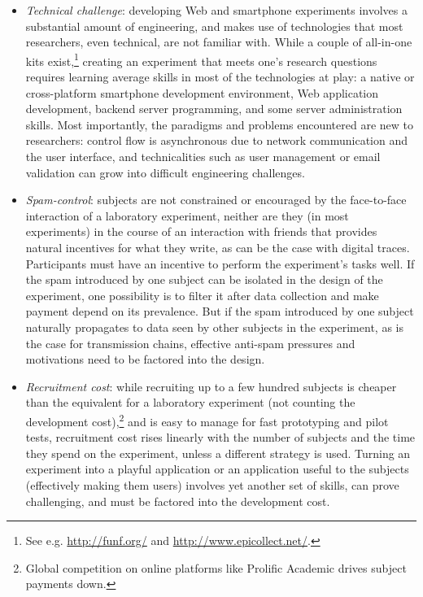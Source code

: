 \begin{itemize}
\item
  \emph{Technical challenge}: developing Web and smartphone experiments
  involves a substantial amount of engineering, and makes use of
  technologies that most researchers, even technical, are not familiar
  with. While a couple of all-in-one kits exist,\footnote{See e.g.
    \url{http://funf.org/} and \url{http://www.epicollect.net/}.}
  creating an experiment that meets one's research questions requires
  learning average skills in most of the technologies at play: a native
  or cross-platform smartphone development environment, Web application
  development, backend server programming, and some server
  administration skills. Most importantly, the paradigms and problems
  encountered are new to researchers: control flow is asynchronous due
  to network communication and the user interface, and technicalities
  such as user management or email validation can grow into difficult
  engineering challenges.
\item
  \emph{Spam-control}: subjects are not constrained or encouraged by the
  face-to-face interaction of a laboratory experiment, neither are they
  (in most experiments) in the course of an interaction with friends
  that provides natural incentives for what they write, as can be the
  case with digital traces. Participants must have an incentive to
  perform the experiment's tasks well. If the spam introduced by one
  subject can be isolated in the design of the experiment, one
  possibility is to filter it after data collection and make payment
  depend on its prevalence. But if the spam introduced by one subject
  naturally propagates to data seen by other subjects in the experiment,
  as is the case for transmission chains, effective anti-spam pressures
  and motivations need to be factored into the design.
\item
  \emph{Recruitment cost}: while recruiting up to a few hundred subjects
  is cheaper than the equivalent for a laboratory experiment (not
  counting the development cost),\footnote{Global competition on online
    platforms like Prolific Academic drives subject payments down.} and
  is easy to manage for fast prototyping and pilot tests, recruitment
  cost rises linearly with the number of subjects and the time they
  spend on the experiment, unless a different strategy is used. Turning
  an experiment into a playful application or an application useful to
  the subjects (effectively making them users) involves yet another set
  of skills, can prove challenging, and must be factored into the
  development cost.
\end{itemize}

